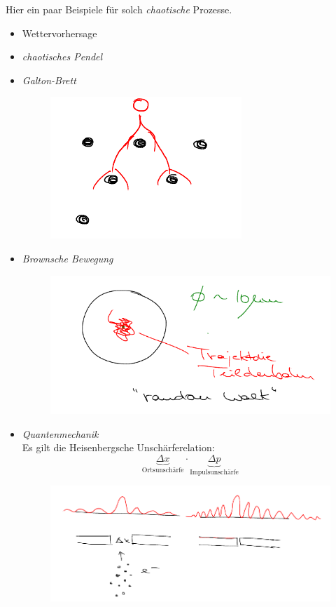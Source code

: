 \begin{Beispiel}
Hier ein paar Beispiele für solch \emph{chaotische} Prozesse.
 \begin{itemize}
\item Wettervorhersage
\item \emph{chaotisches Pendel}
\item \emph{Galton-Brett}
 \begin{figure}[ht]
 \includegraphics{bilder/fig1}
 \end{figure}
\item \emph{Brownsche Bewegung}

 \begin{figure}[ht]
 \includegraphics[scale=0.5]{bilder/fig2}
 \end{figure}

\item \emph{Quantenmechanik}\\
Es gilt die Heisenbergsche Unschärferelation:
\[
\underbrace{\Delta x}_{\text{Ortsunschärfe}} \cdot \underbrace{\Delta p}_{\text{Impulsunschärfe}}
\]
 \begin{figure}[ht]
 \includegraphics[scale=0.5]{bilder/fig3}
 \end{figure}
\end{itemize}
\end{Beispiel}















